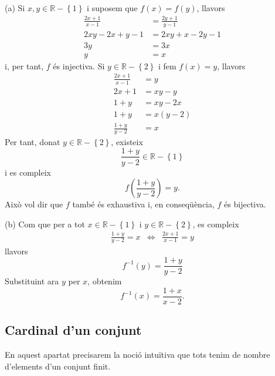 \begin{solucio}
(a) Si $x,y\in\mathbb{R}-\left\{ 1\right\} $ i suposem que $f(x)=f(y)$,
llavors
\begin{align*}
\frac{2x+1}{x-1} & =\frac{2y+1}{y-1} \\
2xy-2x+y-1 & =2xy+x-2y-1 \\
3y & =3x \\
y & =x
\end{align*}
i, per tant, $f$ és injectiva. Si $y\in\mathbb{R}-\left\{ 2\right\} $ i
fem $f(x)=y$, llavors%
\begin{align*}
\frac{2x+1}{x-1} & =y \\
2x+1 & =xy-y \\
1+y & =xy-2x \\
1+y & =x(y-2) \\
\frac{1+y}{y-2} & =x
\end{align*}
Per tant, donat $y\in\mathbb{R}-\left\{ 2\right\} $, existeix
\begin{equation*}
\frac{1+y}{y-2}\in\mathbb{R}-\left\{ 1\right\}
\end{equation*}
i es compleix%
\begin{equation*}
f\left( \frac{1+y}{y-2}\right) =y\text{.}
\end{equation*}
Això vol dir que $f$ també és exhaustiva i, en conseqüència, $f$ és bijectiva.

(b) Com que per a tot $x\in\mathbb{R}-\left\{ 1\right\} $ i $y\in \mathbb{R}%
-\left\{ 2\right\} $, es compleix
\begin{equation*}
\begin{array}{ccc}
\frac{1+y}{y-2}=x & \Longleftrightarrow & \frac{2x+1}{x-1}=y%
\end{array}
\end{equation*}
llavors%
\begin{equation*}
f^{-1}(y)=\frac{1+y}{y-2}
\end{equation*}
Substituint ara $y$ per $x$, obtenim%
\begin{equation*}
f^{-1}(x)=\frac{1+x}{x-2}\text{.}
\end{equation*}
\end{solucio}

\subsection{Cardinal d'un conjunt}

En aquest apartat precisarem la noció intuïtiva que tots tenim de
nombre d'elements d'un conjunt finit.


